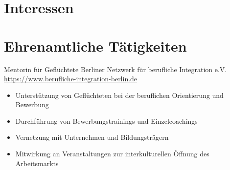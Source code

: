 \documentclass[a4paper, serif, 10pt]{moderncv}
\begin{document}
\section{Interessen}

\section{Ehrenamtliche Tätigkeiten}

        {Mentorin für Geflüchtete}
        {Berliner Netzwerk für berufliche Integration e.V.}
        {\url{https://www.berufliche-integration-berlin.de}}
        {}
        {\begin{itemize}
\item Unterstützung von Geflüchteten bei der beruflichen Orientierung und Bewerbung
\item Durchführung von Bewerbungstrainings und Einzelcoachings
\item Vernetzung mit Unternehmen und Bildungsträgern
\item Mitwirkung an Veranstaltungen zur interkulturellen Öffnung des Arbeitsmarkts
\end{itemize}}
    
\end{document}
